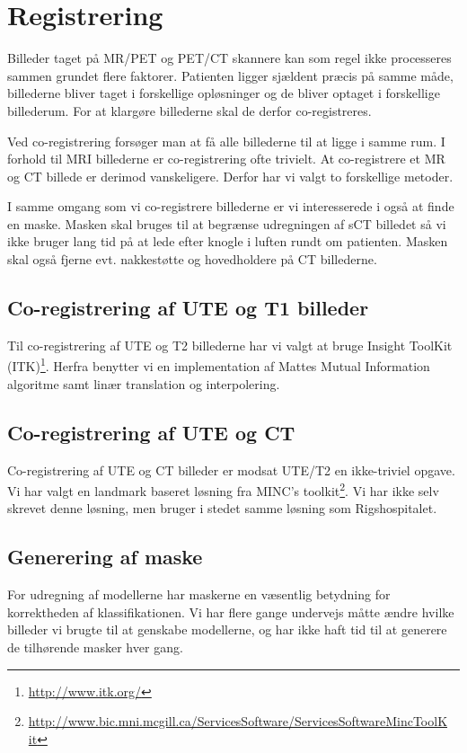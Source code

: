 \section{Registrering}

Billeder taget på MR/PET og PET/CT skannere kan som regel ikke
processeres sammen grundet flere faktorer. Patienten ligger sjældent
præcis på samme måde, billederne bliver taget i forskellige
opløsninger og de bliver optaget i forskellige billederum. For at
klargøre billederne skal de derfor co-registreres.

Ved co-registrering forsøger man at få alle billederne til at ligge i
samme rum. I forhold til MRI billederne er co-registrering ofte trivielt.
At co-registrere et MR og CT billede er derimod vanskeligere. Derfor har
vi valgt to forskellige metoder.

I samme omgang som vi co-registrere billederne er vi interesserede i
også at finde en maske. Masken skal bruges til at begrænse udregningen
af sCT billedet så vi ikke bruger lang tid på at lede efter knogle i
luften rundt om patienten. Masken skal også fjerne evt. nakkestøtte og
hovedholdere på CT billederne.

\subsection{Co-registrering af UTE og T1 billeder}

Til co-registrering af UTE og T2 billederne har vi valgt at bruge
Insight ToolKit (ITK)\footnote{\url{http://www.itk.org/}}. Herfra benytter vi en implementation af Mattes
Mutual Information algoritme samt linær translation og interpolering.

\subsection{Co-registrering af UTE og CT}

Co-registrering af UTE og CT billeder er modsat UTE/T2 en ikke-triviel
opgave. Vi har valgt en landmark baseret løsning fra MINC's toolkit\footnote{\url{http://www.bic.mni.mcgill.ca/ServicesSoftware/ServicesSoftwareMincToolK it}}.
Vi har ikke selv skrevet denne løsning, men bruger i stedet samme
løsning som Rigshospitalet.

\subsection{Generering af maske}

For udregning af modellerne har maskerne en væsentlig betydning for korrektheden af klassifikationen. Vi har flere gange undervejs måtte ændre hvilke billeder vi brugte til at genskabe modellerne, og har ikke haft tid til at generere de tilhørende masker hver gang.

